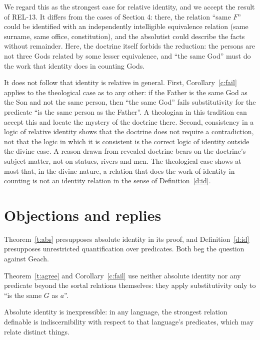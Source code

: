\documentclass{situationist-preprint}
\begin{document}
We regard this as the strongest case for relative identity, and we accept the result of REL-13. It differs from the cases of Section 4: there, the relation \enquote{same $F$} could be identified with an independently intelligible equivalence relation (same surname, same office, constitution), and the absolutist could describe the facts without remainder. Here, the doctrine itself forbids the reduction: the persons are not three Gods related by some lesser equivalence, and \enquote{the same God} must do the work that identity does in counting Gods.

It does not follow that identity is relative in general. First, Corollary~\ref{c:fail} applies to the theological case as to any other: if the Father is the same God as the Son and not the same person, then \enquote{the same God} fails substitutivity for the predicate \enquote{is the same person as the Father}. A theologian in this tradition can accept this and locate the mystery of the doctrine there. Second, consistency in a logic of relative identity shows that the doctrine does not require a contradiction, not that the logic in which it is consistent is the correct logic of identity outside the divine case. A reason drawn from revealed doctrine bears on the doctrine's subject matter, not on statues, rivers and men. The theological case shows at most that, in the divine nature, a relation that does the work of identity in counting is not an identity relation in the sense of Definition~\ref{d:id}.

\section{Objections and replies}

\begin{objection}
Theorem~\ref{t:abs} presupposes absolute identity in its proof, and Definition~\ref{d:id} presupposes unrestricted quantification over predicates. Both beg the question against Geach.
\end{objection}

\begin{reply}
Theorem~\ref{t:agree} and Corollary~\ref{c:fail} use neither absolute identity nor any predicate beyond the sortal relations themselves: they apply substitutivity only to \enquote{is the same $G$ as $a$}.
\end{reply}

\begin{objection}
Absolute identity is inexpressible: in any language, the strongest relation definable is indiscernibility with respect to that language's predicates, which may relate distinct things.
\end{objection}
\end{document}
